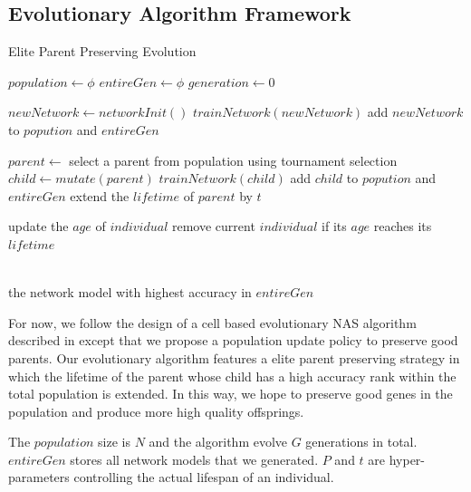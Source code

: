 \documentclass[conference]{IEEEtran}
\begin{document}
  \subsection{Evolutionary Algorithm Framework}
  
  \begin{algorithm}[H]  
    \caption{ Elite Parent Preserving Evolution}
    \begin{algorithmic}[1]  
  
    \State $population\gets \phi$
    \State $entireGen\gets \phi$
    \State $generation\gets 0$
    
    \State $newNetwork\gets networkInit()$
    \State $trainNetwork(newNetwork)$
    \State add $newNetwork$ to $popution$ and $entireGen$
    \EndWhile
    
  
    
      \State $parent\gets$ select a parent from population using tournament selection 
      \State $child \gets mutate(parent)$
      \State $trainNetwork(child)$
      \State add $child$ to $popution$ and $entireGen$
        \State extend the $lifetime$ of $parent$ by $t$
      \EndIf
      
        \State update the $age$ of $individual$
        \State remove current $individual$ if its $ age $ reaches its $lifetime$
      \EndFor
      
      
    \EndWhile
    
    
    \\  
    \Return the network model with highest accuracy in $entireGen$
 
  \end{algorithmic}  
  \end{algorithm}  
  For now, we follow the design of a cell based evolutionary NAS algorithm described in\cite{DBLP:journals/corr/abs-1802-01548} except that we propose a population update policy to preserve good parents. 
  Our evolutionary algorithm features a elite parent preserving strategy in which the lifetime of the parent whose child has a high accuracy rank within the total population is extended. In this way, we hope to preserve good genes in the population and produce more high quality offsprings.

The $population$ size is $N$ and the algorithm evolve $G$ generations in total. $entireGen$ stores all network models that we generated. $P$ and $t$ are hyper-parameters controlling the actual lifespan of an individual.
     
\end{document}
